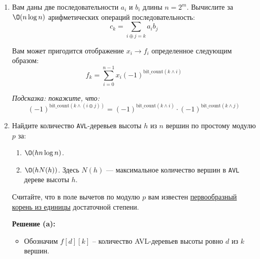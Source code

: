 \begin{enumerate}
\begin{itemize}
      \item \textbf{(b)} Определим $H_{i_1, k_2} = \omega_n^{k_2 i_1} \cdot G_{i_1, k_2}$ (twiddle-множители). Вычисление всех $H$ -- это $\O(n_1 n_2)$ операций.

      Тогда:
      $$f_{n_2 k_1 + k_2} = \sum_{i_1=0}^{n_1-1} \omega_{n_1}^{k_1 i_1} \cdot H_{i_1, k_2}$$

      При фиксированном $k_2$ это DFT размера $n_1$ от последовательности $(H_{0, k_2}, H_{1, k_2}, \ldots, H_{n_1-1, k_2})$. Всего $n_2$ таких DFT.

      Итого: $n_1$ DFT размера $n_2$ + $n_2$ DFT размера $n_1$ + $\O(n_1 n_2)$ операций.
    \end{itemize}

  \item
    Вам даны две последовательности $a_i$ и $b_i$ длины $n = 2^m$. Вычислите за $\O(n \log{n})$
    арифметических операций последовательность:
    $$c_k = \sum_{i \oplus j = k} a_i b_j$$

    Вам может пригодится отображение $x_i \rightarrow f_i$ определенное следующим образом:
    $$f_k = \sum_{i = 0}^{n - 1} x_i (-1)^{\text{bit\_count}(k \land i)}$$

    \textit{Подсказка: покажите, что:}
    $$(-1)^{\text{bit\_count}(k \land (i \oplus j))} = (-1)^{\text{bit\_count}(k \land i)} \cdot (-1)^{\text{bit\_count}(k \land j)}$$

  \item
    Найдите количество \texttt{AVL}-деревьев высоты $h$ из $n$ вершин по простому модулю $p$ за:
    \begin{enumerate}
      \item $\O(h n \log{n})$.
      \item $\O(h N(h))$. Здесь $N(h)$ --- максимальное количество вершин в \texttt{AVL} дереве высоты $h$.
    \end{enumerate}
    Считайте, что в поле вычетов по модулю $p$ вам известен
    \href{https://ru.wikipedia.org/wiki/%D0%9F%D0%B5%D1%80%D0%B2%D0%BE%D0%BE%D0%B1%D1%80%D0%B0%D0%B7%D0%BD%D1%8B%D0%B9_%D0%BA%D0%BE%D1%80%D0%B5%D0%BD%D1%8C_%D0%B8%D0%B7_%D0%B5%D0%B4%D0%B8%D0%BD%D0%B8%D1%86%D1%8B}{первообразный корень из единицы}
    достаточной степени.

    \textbf{Решение (a):}

    \begin{itemize}
      \item Обозначим $f[d][k]$ -- количество AVL-деревьев высоты ровно $d$ из $k$ вершин.


\end{itemize}
\end{enumerate}
